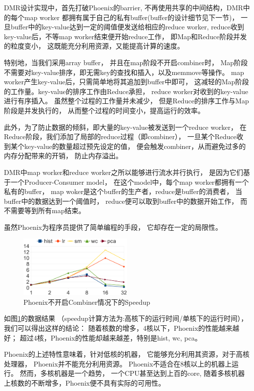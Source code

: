 DMR设计实现中，首先打破Phoenix的barrier,
不再使用共享的中间结构，DMR中的每个map worker
都拥有属于自己的私有buffer(buffer的设计细节见下一节)，
一旦buffer中的key-value达到一定的阈值便发送给相应的reduce worker,
reduce收到key-value后，不等map worker结束便开始reduce工作，
即Map和Reduce阶段并发的粒度变小，
这既能充分利用资源，又能提高计算的速度。

特别地，当我们采用array buffer，
并且在map阶段不开启combiner时，
Map阶段不需要对key-value排序，即无需key的查找和插入，以及memmove等操作。
map worker产生key-value后，只需简单地将其追加到buffer中即可，
这减轻的Map阶段的工作量。key-value的排序工作由Reduce承担，
reduce worker对收到的key-value进行有序插入。
虽然整个过程的工作量并未减少，
但是Reduce的排序工作与Map阶段是并发执行的，
从而整个过程的时间变小，提高运行的效率。

此外，为了防止数据的倾斜，即大量的key-value被发送到一个reduce worker，
在Reduce阶段，我们添加了局部的reduce过程（即combiner），
一旦某个Reduce收到某个key-value的数量超过预先设定的值，
便会触发combiner，从而避免过多的内存分配带来的开销，
防止内存溢出。

DMR中map worker和reduce worker之所以能够进行流水并行执行，
是因为它们基于一个Producer-Consumer model，
在这个model中，每个map worker都拥有一个私有的buffer，
map woker是这个buffer的生产者，reduce是buffer的消费者，
当buffer中的数据达到一个阈值时，
reduce便可以取到buffer中的数据开始工作，
而不需要等到所有map结束。



虽然Phoenix为程序员提供了简单编程的手段，
它却存在一定的局限性。
\begin{figure}[!h!t]  
    \centering
    \includegraphics[width=0.5\textwidth]{img/phoenix_speedup.eps}
    \caption{Phoenix不开启Combiner情况下的Speedup}
    \label{phoenix:speedup}
\end{figure}
如图\ref{phoenix:speedup}的数据结果
（speedup计算方法为:高核下的运行时间/单核下的运行时间），
我们可以得出这样的结论：
随着核数的增多，4核以下，Phoenix的性能越来越好；
超过4核，Phoenix的性能却越来越差，特别是hist, wc, pca。

Phoenix的上述特性意味着，针对低核的机器，
它能够充分利用其资源，对于高核处理器，
Phoenix并不能充分利用资源。
Phoenix不适合在8核以上的机器上运行。
然而，多核机器是一个趋势，
一个CPU甚至达到上百的core\cite{Borkar2007Thousand},
随着多核机器上核数的不断增多，Phoenix便不具有实际的可用性。

